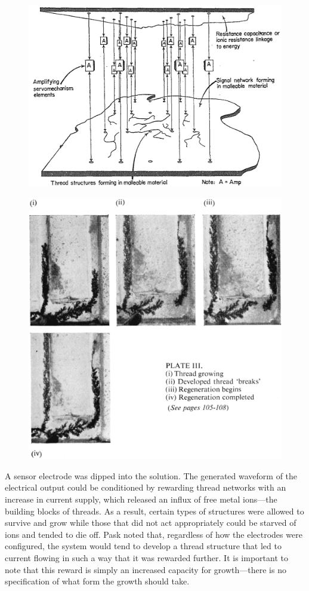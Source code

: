 \begin{figure}[t]
    \centering
    \includegraphics[width=0.7\linewidth]{fig/pask.png}
\end{figure}
\begin{figure}[t]
    \centering
    \includegraphics[width=0.65\linewidth]{fig/threads.png}
\end{figure}


A sensor electrode was dipped into the solution.
The generated waveform of the electrical output could be conditioned by rewarding thread networks with an increase in current supply, which released an influx of free metal ions---the building blocks of threads.
As a result, certain types of structures were allowed to survive and grow while those that did not act appropriately could be
starved of ions and tended to die off. 
Pask noted that, regardless of how the electrodes were configured, the system would tend to develop a thread structure that led to current flowing in such a way that it was rewarded further.
It is important to note that this reward is simply an increased capacity for growth---there is no specification of what form the growth should take. 

